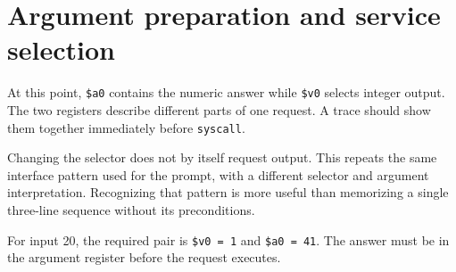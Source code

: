 \section{Argument preparation and service
  selection}\label{001-console-calculation-p15-argument-preparation-and-service-selection}

At this point, \texttt{\$a0} contains the numeric answer while
\texttt{\$v0} selects integer output. The two registers describe
different parts of one request. A trace should show them together
immediately before \texttt{syscall}.

Changing the selector does not by itself request output. This repeats
the same interface pattern used for the prompt, with a different
selector and argument interpretation. Recognizing that pattern is more
useful than memorizing a single three-line sequence without its
preconditions.

For input 20, the required pair is \texttt{\$v0\ =\ 1} and
\texttt{\$a0\ =\ 41}. The answer must be in the argument register before
the request executes.
